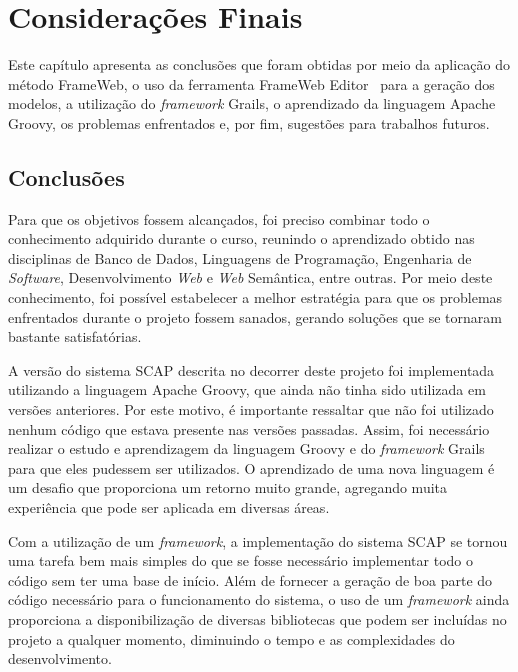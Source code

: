 \chapter{Considerações Finais}
\label{sec-conclusoes}

Este capítulo apresenta as conclusões que foram obtidas por meio da aplicação do método FrameWeb, o uso da ferramenta FrameWeb Editor~\cite{campos-souza:webmedia17} para a geração dos modelos, a utilização do \textit{framework} Grails, o aprendizado da linguagem Apache Groovy, os problemas enfrentados e, por fim, sugestões para trabalhos futuros.

\section{Conclusões}
\label{sec-conclusoes-consideracoes}

Para que os objetivos fossem alcançados, foi preciso combinar todo o conhecimento adquirido durante o curso, reunindo o aprendizado obtido nas disciplinas de Banco de Dados, Linguagens de Programação, Engenharia de \textit{Software}, Desenvolvimento \textit{Web} e \textit{Web} Semântica, entre outras. Por meio deste conhecimento, foi possível estabelecer a melhor estratégia para que os problemas enfrentados durante o projeto fossem sanados, gerando soluções que se tornaram bastante satisfatórias.  

A versão do sistema SCAP descrita no decorrer deste projeto foi implementada utilizando a linguagem Apache Groovy, que ainda não tinha sido utilizada em versões anteriores. Por este motivo, é importante ressaltar que não foi utilizado nenhum código que estava presente nas versões passadas. Assim, foi necessário realizar o estudo e aprendizagem da linguagem Groovy e do \textit{framework} Grails para que eles pudessem ser utilizados. O aprendizado de uma nova linguagem é um desafio que proporciona um retorno muito grande, agregando muita experiência que pode ser aplicada em diversas áreas.

Com a utilização de um \textit{framework}, a implementação do sistema SCAP se tornou uma tarefa bem mais simples do que se fosse necessário implementar todo o código sem ter uma base de início. Além de fornecer a geração de boa parte do código necessário para o funcionamento do sistema, o uso de um \textit{framework} ainda proporciona a disponibilização de diversas bibliotecas que podem ser incluídas no projeto a qualquer momento, diminuindo o tempo e as complexidades do desenvolvimento.  

